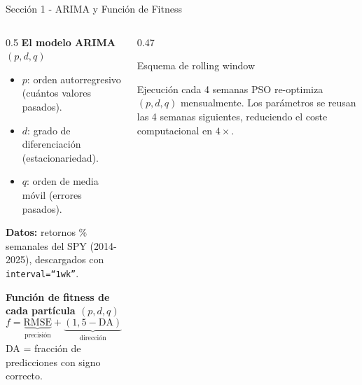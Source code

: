 \documentclass[aspectratio=169]{beamer}
\begin{document}
\begin{frame}{Sección 1 - ARIMA y Función de Fitness}
  \begin{columns}[T]
    \begin{column}{0.5\textwidth}
      \textbf{El modelo ARIMA$(p,d,q)$}
      \begin{itemize}
        \item $p$: orden autorregresivo (cuántos valores pasados).
        \item $d$: grado de diferenciación (estacionariedad).
        \item $q$: orden de media móvil (errores pasados).
      \end{itemize}
      \textbf{Datos:} retornos \% semanales del SPY (2014-2025),
      descargados con \texttt{interval=``1wk''}.

      \vspace{8pt}
      \textbf{Función de fitness de cada partícula $(p,d,q)$}
      \[
        f = \underbrace{\text{RMSE}}_{\text{precisión}}
          + \underbrace{(1{,}5 - \text{DA})}_{\text{dirección}}
          + \underbrace{0{,}05(p+q)}_{\text{complejidad}}
      \]
      DA = fracción de predicciones con signo correcto.
    \end{column}
    \begin{column}{0.47\textwidth}
      \begin{block}{Esquema de rolling window}
        \vspace{4pt}
      \end{block}

      \vspace{6pt}
      \begin{alertblock}{Ejecución cada 4 semanas}
        PSO re-optimiza $(p,d,q)$ mensualmente.
        Los parámetros se reusan las 4 semanas siguientes,
        reduciendo el coste computacional en $4\times$.
      \end{alertblock}
    \end{column}
  \end{columns}
\end{frame}
\end{document}
